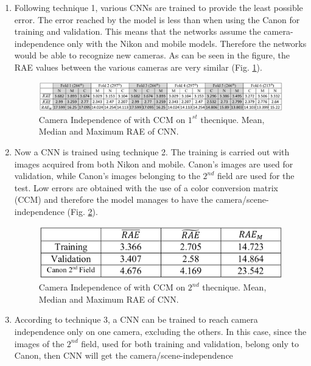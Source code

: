 \begin{enumerate}
    \item Following technique 1, various CNNs are trained to provide the least 
    possible error. The error reached by the model is less than when using 
    the Canon for training and validation. This means that the networks 
    assume the camera-independence only with the Nikon and mobile models. 
    Therefore the networks would be able to recognize new cameras. As 
    can be seen in the figure, the RAE values between the various cameras 
    are very similar (Fig. \ref{fig:CNNtec1}).
    \begin{figure}[htbp]
        \centering
        \includegraphics[width = 1 \linewidth]{images/paper4/CNNtec1.png}
        \centering
        \caption{Camera Independence of \cite{0807099122} with CCM on $ 1^{st} $ thecnique. Mean, Median and Maximum RAE of CNN.}
        \label{fig:CNNtec1}
    \end{figure}
    \item Now a CNN is trained using technique 2. The training is carried out 
    with images acquired from both Nikon and mobile. Canon's images are 
    used for validation, while Canon's images belonging to the $ 2^{nd} $ field 
    are used for the test. Low errors are obtained with the use of a color 
    conversion matrix (CCM) \cite{0807099129} and therefore the model manages to have 
    the camera/scene-independence (Fig. \ref{fig:CNNtec2}).
    \begin{figure}[h!]
        \centering
        \includegraphics[width = 0.6 \linewidth]{images/paper4/CNNtec2.png}
        \centering
        \caption{Camera Independence of \cite{0807099122} with CCM on $ 2^{nd} $ thecnique. Mean, Median and Maximum RAE of CNN.}
        \label{fig:CNNtec2}
    \end{figure}
    \item According to technique 3, a CNN can be trained to reach camera independence 
    only on one camera, excluding the others. In this case, since 
    the images of the $ 2^{nd} $ field, used for both training and validation, belong 
    only to Canon, then CNN will get the camera/scene-independence 

\end{enumerate}
